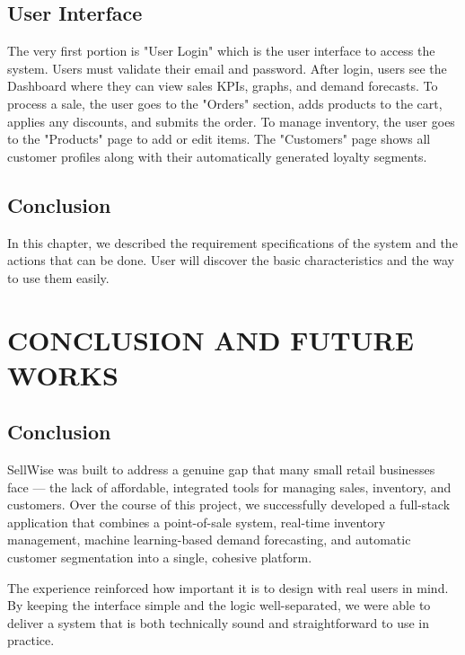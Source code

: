 \documentclass[12pt,a4paper]{report}
\begin{document}
\section{User Interface}
The very first portion is "User Login" which is the user interface to access the system. Users must validate their email and password.
After login, users see the Dashboard where they can view sales KPIs, graphs, and demand forecasts. 
To process a sale, the user goes to the "Orders" section, adds products to the cart, applies any discounts, and submits the order.
To manage inventory, the user goes to the "Products" page to add or edit items.
The "Customers" page shows all customer profiles along with their automatically generated loyalty segments.

\section{Conclusion}
In this chapter, we described the requirement specifications of the system and the actions that can be done. User will discover the basic characteristics and the way to use them easily.


\chapter{CONCLUSION AND FUTURE WORKS}

\section{Conclusion}
SellWise was built to address a genuine gap that many small retail businesses face — the lack of affordable, integrated tools for managing sales, inventory, and customers. Over the course of this project, we successfully developed a full-stack application that combines a point-of-sale system, real-time inventory management, machine learning-based demand forecasting, and automatic customer segmentation into a single, cohesive platform.

The experience reinforced how important it is to design with real users in mind. By keeping the interface simple and the logic well-separated, we were able to deliver a system that is both technically sound and straightforward to use in practice.
\end{document}
